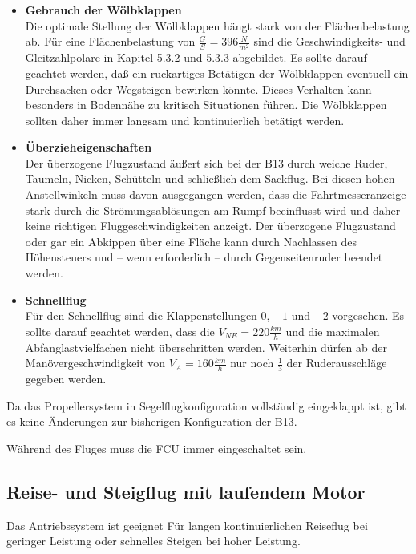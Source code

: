 \begin{itemize}
\item \textbf{Gebrauch der Wölbklappen}\\
Die optimale Stellung der Wölbklappen hängt stark von der Flächenbelastung ab. Für eine Flächenbelastung von $\frac{G}{S}=396 \frac{N}{m^2}$ sind die Geschwindigkeits- und Gleitzahlpolare in Kapitel 5.3.2 und 5.3.3 abgebildet. 
Es sollte darauf geachtet werden, daß ein ruckartiges Betätigen der Wölbklappen eventuell ein Durchsacken oder Wegsteigen bewirken könnte. Dieses Verhalten kann besonders in Bodennähe zu kritisch Situationen führen. Die Wölbklappen sollten daher immer langsam und kontinuierlich betätigt werden. 
\item \textbf{Überzieheigenschaften}\\
Der überzogene Flugzustand äußert sich bei der B13 durch weiche Ruder, Taumeln, Nicken, Schütteln und schließlich dem Sackflug. Bei diesen hohen Anstellwinkeln muss davon ausgegangen werden, dass die Fahrtmesseranzeige stark durch die Strömungsablösungen am Rumpf beeinflusst wird und daher keine richtigen Fluggeschwindigkeiten anzeigt.  Der überzogene Flugzustand oder gar ein Abkippen über eine Fläche kann durch Nachlassen des Höhensteuers und – wenn erforderlich – durch Gegenseitenruder beendet werden. 
\item \textbf{Schnellflug}\\
Für den Schnellflug sind die Klappenstellungen $0$, $-1$ und $-2$ vorgesehen. Es sollte darauf geachtet werden, dass die $V_{NE} = 220 \frac{km}{h}$  und die maximalen Abfanglastvielfachen nicht überschritten werden. Weiterhin dürfen ab der Manövergeschwindigkeit von $V_A = 160 \frac{km}{h}$ nur noch $\frac{1}{3}$ der Ruderausschläge gegeben werden. 

\end{itemize}

Da das Propellersystem in Segelflugkonfiguration vollständig eingeklappt ist, gibt es keine Änderungen zur bisherigen Konfiguration der B13.

Während des Fluges muss die FCU immer eingeschaltet sein.

\newpage
\subsection{Reise- und Steigflug mit laufendem Motor}
Das Antriebssystem ist geeignet Für langen kontinuierlichen Reiseflug bei geringer Leistung oder schnelles Steigen bei hoher Leistung.\\

